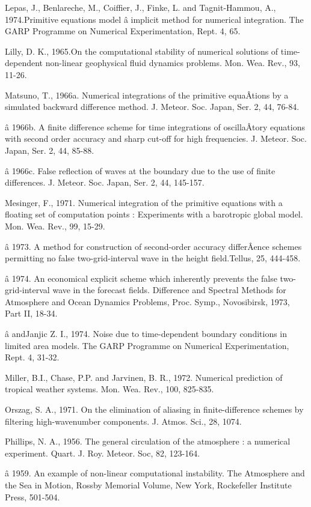 Lepas, J., Benlareche, M., Coiffier, J., Finke, L. and Tagnit-Hammou,
A., 1974.Primitive equations model â implicit method for numerical
integration. The GARP Programme on Numerical Experimentation, Rept. 4,
65.

Lilly, D. K., 1965.On the computational stability of numerical solutions
of time-dependent non-linear geophysical fluid dynamics problems. Mon.
Wea. Rev., 93, 11-26.

Matsuno, T., 1966a. Numerical integrations of the primitive equaÂ­tions
by a simulated backward difference method. J. Meteor. Soc. Japan, Ser.
2, 44, 76-84.

â 1966b. A finite difference scheme for time integrations of
oscillaÂ­tory equations with second order accuracy and sharp cut-off for
high frequencies. J. Meteor. Soc. Japan, Ser. 2, 44, 85-88.

â 1966c. False reflection of waves at the boundary due to the use of
finite differences. J. Meteor. Soc. Japan, Ser. 2, 44, 145-157.

Mesinger, F., 1971. Numerical integration of the primitive equations
with a floating set of computation points : Experiments with a
barotropic global model. Mon. Wea. Rev., 99, 15-29.

â 1973. A method for construction of second-order accuracy differÂ­ence
schemes permitting no false two-grid-interval wave in the height
field.Tellus, 25, 444-458.

â 1974. An economical explicit scheme which inherently prevents the
false two-grid-interval wave in the forecast fields. Difference and
Spectral Methods for Atmosphere and Ocean Dynamics Problems, Proc.
Symp., Novosibirsk, 1973, Part II, 18-34.

â andJanjic Z. I., 1974. Noise due to time-dependent boundary conditions
in limited area models. The GARP Programme on Numerical Experimentation,
Rept. 4, 31-32.

Miller, B.I., Chase, P.P. and Jarvinen, B. R., 1972. Numerical
prediction of tropical weather systems. Mon. Wea. Rev., 100, 825-835.

Orszag, S. A., 1971. On the elimination of aliasing in finite-difference
schemes by filtering high-wavenumber components. J. Atmos. Sci., 28,
1074.

Phillips, N. A., 1956. The general circulation of the atmosphere : a
numerical experiment. Quart. J. Roy. Meteor. Soc, 82, 123-164.

â 1959. An example of non-linear computational instability. The
Atmosphere and the Sea in Motion, Rossby Memorial Volume, New York,
Rockefeller Institute Press, 501-504.


